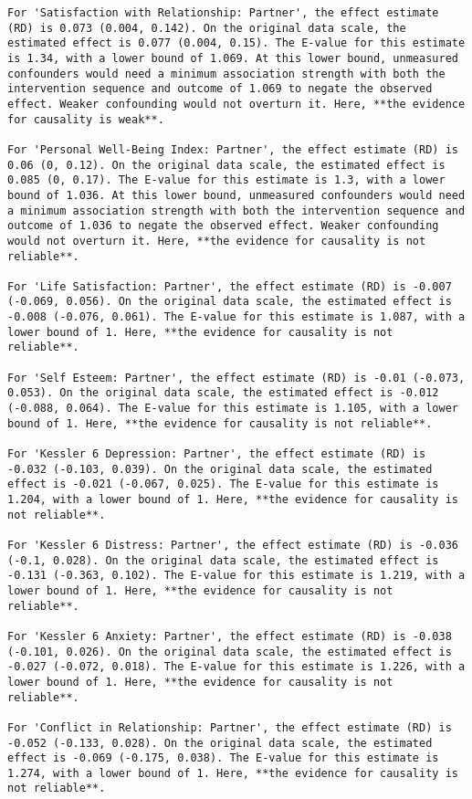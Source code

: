 \documentclass[
  singlecolumn]{article}
\begin{document}
\begin{verbatim}
For 'Satisfaction with Relationship: Partner', the effect estimate (RD) is 0.073 (0.004, 0.142). On the original data scale, the estimated effect is 0.077 (0.004, 0.15). The E-value for this estimate is 1.34, with a lower bound of 1.069. At this lower bound, unmeasured confounders would need a minimum association strength with both the intervention sequence and outcome of 1.069 to negate the observed effect. Weaker confounding would not overturn it. Here, **the evidence for causality is weak**.

For 'Personal Well-Being Index: Partner', the effect estimate (RD) is 0.06 (0, 0.12). On the original data scale, the estimated effect is 0.085 (0, 0.17). The E-value for this estimate is 1.3, with a lower bound of 1.036. At this lower bound, unmeasured confounders would need a minimum association strength with both the intervention sequence and outcome of 1.036 to negate the observed effect. Weaker confounding would not overturn it. Here, **the evidence for causality is not reliable**.

For 'Life Satisfaction: Partner', the effect estimate (RD) is -0.007 (-0.069, 0.056). On the original data scale, the estimated effect is -0.008 (-0.076, 0.061). The E-value for this estimate is 1.087, with a lower bound of 1. Here, **the evidence for causality is not reliable**.

For 'Self Esteem: Partner', the effect estimate (RD) is -0.01 (-0.073, 0.053). On the original data scale, the estimated effect is -0.012 (-0.088, 0.064). The E-value for this estimate is 1.105, with a lower bound of 1. Here, **the evidence for causality is not reliable**.

For 'Kessler 6 Depression: Partner', the effect estimate (RD) is -0.032 (-0.103, 0.039). On the original data scale, the estimated effect is -0.021 (-0.067, 0.025). The E-value for this estimate is 1.204, with a lower bound of 1. Here, **the evidence for causality is not reliable**.

For 'Kessler 6 Distress: Partner', the effect estimate (RD) is -0.036 (-0.1, 0.028). On the original data scale, the estimated effect is -0.131 (-0.363, 0.102). The E-value for this estimate is 1.219, with a lower bound of 1. Here, **the evidence for causality is not reliable**.

For 'Kessler 6 Anxiety: Partner', the effect estimate (RD) is -0.038 (-0.101, 0.026). On the original data scale, the estimated effect is -0.027 (-0.072, 0.018). The E-value for this estimate is 1.226, with a lower bound of 1. Here, **the evidence for causality is not reliable**.

For 'Conflict in Relationship: Partner', the effect estimate (RD) is -0.052 (-0.133, 0.028). On the original data scale, the estimated effect is -0.069 (-0.175, 0.038). The E-value for this estimate is 1.274, with a lower bound of 1. Here, **the evidence for causality is not reliable**.
\end{verbatim}
\end{document}
